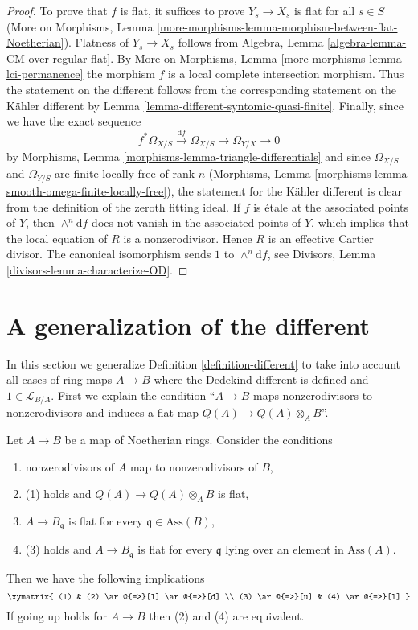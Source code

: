 \begin{proof}
To prove that $f$ is flat, it suffices to prove $Y_s \to X_s$
is flat for all $s \in S$ (More on Morphisms, Lemma
\ref{more-morphisms-lemma-morphism-between-flat-Noetherian}).
Flatness of $Y_s \to X_s$ follows from
Algebra, Lemma \ref{algebra-lemma-CM-over-regular-flat}.
By More on Morphisms, Lemma
\ref{more-morphisms-lemma-lci-permanence}
the morphism $f$ is a local complete intersection morphism.
Thus the statement on the different follows from the
corresponding statement on the K\"ahler different by
Lemma \ref{lemma-different-syntomic-quasi-finite}.
Finally, since we have the exact sequence
$$
f^*\Omega_{X/S} \xrightarrow{\text{d}f} \Omega_{X/S} \to \Omega_{Y/X} \to 0
$$
by Morphisms, Lemma \ref{morphisms-lemma-triangle-differentials}
and since $\Omega_{X/S}$ and $\Omega_{Y/S}$ are finite locally free
of rank $n$ (Morphisms, Lemma
\ref{morphisms-lemma-smooth-omega-finite-locally-free}),
the statement for the K\"ahler different is clear from the definition
of the zeroth fitting ideal. If $f$ is \'etale at the associated
points of $Y$, then $\wedge^n\text{d}f$ does not vanish in
the associated points of $Y$, which implies that the local equation
of $R$ is a nonzerodivisor. Hence $R$ is an effective Cartier divisor.
The canonical isomorphism sends $1$ to $\wedge^n\text{d}f$, see
Divisors, Lemma \ref{divisors-lemma-characterize-OD}.
\end{proof}





\section{A generalization of the different}
\label{section-different-generalization}

\noindent
In this section we generalize Definition \ref{definition-different}
to take into account all cases of ring maps $A \to B$
where the Dedekind different is defined and $1 \in \mathcal{L}_{B/A}$.
First we explain the condition ``$A \to B$ maps nonzerodivisors to
nonzerodivisors and induces a flat map $Q(A) \to Q(A) \otimes_A B$''.

\begin{lemma}
\label{lemma-explain-condition}
Let $A \to B$ be a map of Noetherian rings. Consider the conditions
\begin{enumerate}
\item nonzerodivisors of $A$ map to nonzerodivisors of $B$,
\item (1) holds and $Q(A) \to Q(A) \otimes_A B$ is flat,
\item $A \to B_\mathfrak q$ is flat for every
$\mathfrak q \in \text{Ass}(B)$,
\item (3) holds and $A \to B_\mathfrak q$ is flat for every $\mathfrak q$
lying over an element in $\text{Ass}(A)$.
\end{enumerate}
Then we have the following implications
$$
\xymatrix{
(1) & (2) \ar@{=>}[l] \ar@{=>}[d] \\
(3) \ar@{=>}[u] & (4) \ar@{=>}[l]
}
$$
If going up holds for $A \to B$ then (2) and (4) are equivalent.
\end{lemma}

